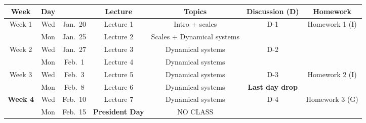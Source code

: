 \documentclass[12pt]{article}
\newcommand{\tro}{\mbox{D}}
\begin{document}

\small{
\begin{tabular}{ccccccc}
Week & Day &  & Lecture & Topics & Discussion (D) & Homework\\
  \hline
 Week 1  & Wed& Jan.~20  &  Lecture 1  &  Intro + scales & D-1 &  Homework 1 (I) \\
  \hline  
          & Mon & Jan.~25  & Lecture 2 & Scales + Dynamical systems &  &  \\
  Week 2  & Wed & Jan.~27  &  Lecture 3  & Dynamical systems  &  D-2&  \\
  \hline  
         &  Mon & Feb.~1  &  Lecture 4    & Dynamical systems &    &\\
  Week 3  & Wed & Feb.~3 &   Lecture 5  &  Dynamical systems & D-3 &Homework 2 (I) \\
  \hline  
&        Mon & Feb.~8 & Lecture 6 &Dynamical systems & \bf{Last day drop}      &    \\
 {\bf  Week 4}    & Wed & Feb.~10  &   Lecture 7  &Dynamical systems & D-4  &Homework 3 (G)   \\
  \hline  
&  Mon & Feb.~15 &  \bf{President Day} & NO CLASS &   &      \\

\end{tabular}}
\end{document}
